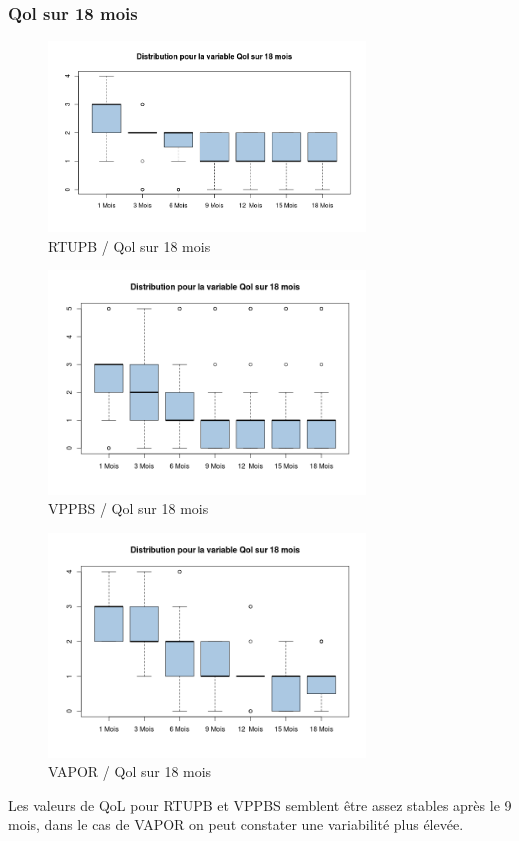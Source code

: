 %
%


\subsubsection{Qol sur 18 mois }

\begin{figure}[H]
\centering
\includegraphics[width=0.75\textwidth]{../Fig/RTUPB/rtupb-boxplot-post-Qol}
\caption{RTUPB / Qol sur 18 mois}
\end{figure}	
	
\begin{figure}[H]
\centering
\includegraphics[width=0.75\textwidth]{../Fig/VPPBS/vppbs-boxplot-post-Qol}
\caption{VPPBS / Qol sur 18 mois}
\end{figure}	
	
	
\begin{figure}[H]
\centering
\includegraphics[width=0.75\textwidth]{../Fig/VAPOR/vapor-boxplot-post-Qol}
\caption{VAPOR / Qol sur 18 mois}
\end{figure}	
	

%

Les valeurs de QoL pour RTUPB et VPPBS semblent être assez stables après le 9 mois, 
dans le cas de VAPOR on peut constater une variabilité plus élevée.  	
